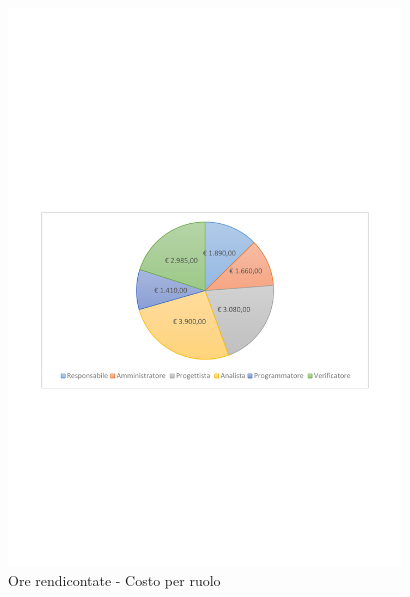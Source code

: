 \documentclass[../PianoProgetto.tex]{subfiles}
\begin{document}
	\begin{figure}[!h]
		\centering
		\includegraphics[width=0.93\textwidth , trim=2cm 9.5cm 2cm 11cm]{grafici/Riepilogo/Rendicontate/costo}
			\caption{Ore rendicontate - Costo per ruolo}
		\label{fig:CircleChart-rendicontate_costo}
	\end{figure}
\vfill			
\end{document}
